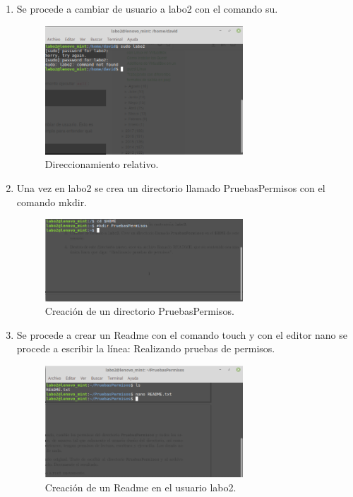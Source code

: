 \documentclass[11pt]{article}
\begin{document}
\begin{enumerate}
\begin{figure}[H]
\end{figure}

\item Se procede a cambiar de usuario a labo2 con el comando su.
\begin{figure}[H]
  \centering
    \includegraphics[width=0.7\textwidth]{img/3}
  \caption{Direccionamiento relativo.}
 
\end{figure}

\item  Una vez en labo2 se crea un directorio llamado PruebasPermisos con el comando mkdir.
\begin{figure}[H]
  \centering
    \includegraphics[width=0.7\textwidth]{img/4}
  \caption{Creación de un directorio PruebasPermisos.}
 
\end{figure}

\item Se procede a crear un Readme con el comando touch y con el editor nano se procede a escribir la línea: Realizando pruebas de permisos.
\begin{figure}[H]
  \centering
    \includegraphics[width=0.7\textwidth]{img/5}
  \caption{Creación de un Readme en el usuario labo2.}
 

\end{figure}
\end{enumerate}
\end{document}
